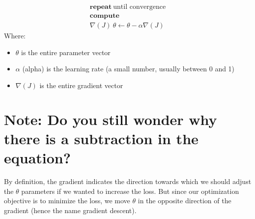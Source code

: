 $$ 
\begin{matrix}
\textbf{repeat} \ \text{until convergence} \\
\textbf{compute} \\
\nabla{(J)} \  \theta \gets \theta - \alpha \nabla(J)
\end{matrix}
$$
Where:
\begin{itemize}
    \item $\theta$ is the entire parameter vector
    \item $\alpha$ (alpha) is the learning rate (a small number, usually between 0 and 1)
    \item $\nabla{(J)}$ is the entire gradient vector
\end{itemize}

\section*{Note: Do you still wonder why there is a subtraction in the equation?}
By definition, the gradient indicates the direction towards which we 
should adjust the $\theta$ parameters if we wanted to increase the loss. 
But since our optimization objective is to minimize the loss,
we move $\theta$ in the opposite direction of the gradient 
(hence the name gradient descent).